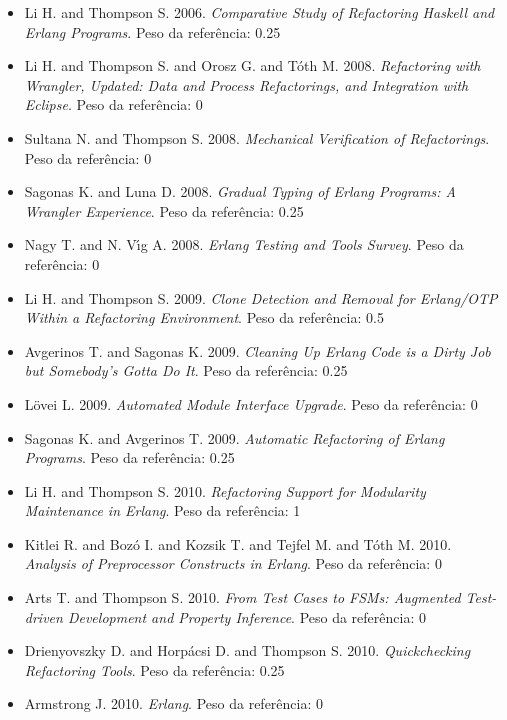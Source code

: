 \begin{itemize}
\item Li H. and Thompson S.
      2006.
      {\it Comparative Study of Refactoring Haskell and Erlang Programs}.
      Peso da referência: 0.25
\item Li H. and Thompson S. and Orosz G. and T\'{o}th M.
      2008.
      {\it Refactoring with Wrangler, Updated: Data and Process Refactorings, and Integration with Eclipse}.
      Peso da referência: 0
\item Sultana N. and Thompson S.
      2008.
      {\it Mechanical Verification of Refactorings}.
      Peso da referência: 0
\item Sagonas K. and Luna D.
      2008.
      {\it Gradual Typing of Erlang Programs: A Wrangler Experience}.
      Peso da referência: 0.25
\item Nagy T. and N. V\'{\i}g A.
      2008.
      {\it Erlang Testing and Tools Survey}.
      Peso da referência: 0
\item Li H. and Thompson S.
      2009.
      {\it Clone Detection and Removal for Erlang/OTP Within a Refactoring Environment}.
      Peso da referência: 0.5
\item Avgerinos T. and Sagonas K.
      2009.
      {\it Cleaning Up Erlang Code is a Dirty Job but Somebody's Gotta Do It}.
      Peso da referência: 0.25
\item L\"{o}vei L.
      2009.
      {\it Automated Module Interface Upgrade}.
      Peso da referência: 0
\item Sagonas K. and Avgerinos T.
      2009.
      {\it Automatic Refactoring of Erlang Programs}.
      Peso da referência: 0.25
\item Li H. and Thompson S.
      2010.
      {\it Refactoring Support for Modularity Maintenance in Erlang}.
      Peso da referência: 1
\item Kitlei R. and Boz\'{o} I. and Kozsik T. and Tejfel M. and T\'{o}th M.
      2010.
      {\it Analysis of Preprocessor Constructs in Erlang}.
      Peso da referência: 0
\item Arts T. and Thompson S.
      2010.
      {\it From Test Cases to FSMs: Augmented Test-driven Development and Property Inference}.
      Peso da referência: 0
\item Drienyovszky D. and Horp\'{a}csi D. and Thompson S.
      2010.
      {\it Quickchecking Refactoring Tools}.
      Peso da referência: 0.25
\item Armstrong J.
      2010.
      {\it Erlang}.
      Peso da referência: 0

\end{itemize}
